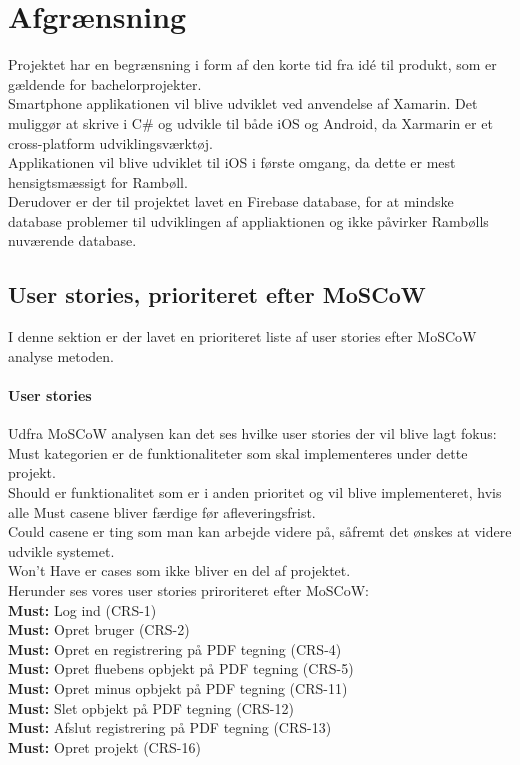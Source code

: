 \chapter{Afgrænsning} \label{sec:Afgraensning}
Projektet har en begrænsning i form af den korte tid fra idé til produkt, som er gældende for bachelorprojekter.\\
Smartphone applikationen vil blive udviklet ved anvendelse af Xamarin. Det muliggør at skrive i C\# og udvikle til både iOS og Android, da Xarmarin er et cross-platform udviklingsværktøj. \\
Applikationen vil blive udviklet til iOS i første omgang, da dette er mest hensigtsmæssigt for Rambøll. \\
Derudover er der til projektet lavet en Firebase database, for at mindske database problemer til udviklingen af appliaktionen og ikke påvirker Rambølls nuværende database. \\

\section{User stories, prioriteret efter MoSCoW} \label{sec:MoSCoW}
I denne sektion er der lavet en prioriteret liste af user stories efter MoSCoW analyse metoden\cite{MoSCoW}.

\subsubsection{User stories}
Udfra MoSCoW analysen kan det ses hvilke user stories der vil blive lagt fokus: \\
Must kategorien er de funktionaliteter som skal implementeres under dette projekt.\\ 
Should er funktionalitet som er i anden prioritet og vil blive implementeret, hvis alle Must casene bliver færdige før afleveringsfrist.\\ 
Could casene er ting som man kan arbejde videre på, såfremt det ønskes at videre udvikle systemet. \\
Won't Have er cases som ikke bliver en del af projektet.\\

Herunder ses vores user stories priroriteret efter MoSCoW: \\
\textbf{Must:} Log ind (CRS-1) \\
\textbf{Must:} Opret bruger (CRS-2) \\
\textbf{Must:} Opret en registrering på PDF tegning (CRS-4) \\
\textbf{Must:} Opret fluebens opbjekt på PDF tegning (CRS-5) \\
\textbf{Must:} Opret minus opbjekt på PDF tegning (CRS-11) \\
\textbf{Must:} Slet opbjekt på PDF tegning (CRS-12) \\
\textbf{Must:} Afslut registrering på PDF tegning (CRS-13) \\
\textbf{Must:} Opret projekt (CRS-16) \\ \\

